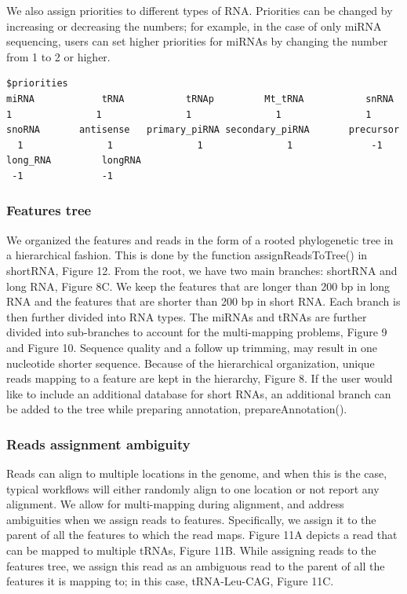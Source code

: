 \documentclass[12pt,twoside]{reedthesis}
\begin{document}
We also assign priorities to different types of RNA. Priorities can be
changed by increasing or decreasing the numbers; for example, in the
case of only miRNA sequencing, users can set higher priorities for
miRNAs by changing the number from 1 to 2 or higher.
\begin{verbatim}
$priorities
miRNA            tRNA           tRNAp         Mt_tRNA           snRNA         1               1               1               1               1
snoRNA       antisense   primary_piRNA secondary_piRNA       precursor
  1               1               1               1              -1
long_RNA         longRNA
 -1              -1
\end{verbatim}
\hypertarget{features-tree}{%
\subsubsection{Features tree}\label{features-tree}}

We organized the features and reads in the form of a rooted phylogenetic
tree in a hierarchical fashion. This is done by the function
assignReadsToTree() in shortRNA, Figure 12. From the root, we have two
main branches: shortRNA and long RNA, Figure 8C. We keep the features
that are longer than 200 bp in long RNA and the features that are
shorter than 200 bp in short RNA. Each branch is then further divided
into RNA types. The miRNAs and tRNAs are further divided into
sub-branches to account for the multi-mapping problems, Figure 9 and
Figure 10. Sequence quality and a follow up trimming, may result in one
nucleotide shorter sequence. Because of the hierarchical organization,
unique reads mapping to a feature are kept in the hierarchy, Figure 8.
If the user would like to include an additional database for short RNAs,
an additional branch can be added to the tree while preparing
annotation, prepareAnnotation().

\hypertarget{reads-assignment-ambiguity}{%
\subsubsection{Reads assignment ambiguity}\label{reads-assignment-ambiguity}}

Reads can align to multiple locations in the genome, and when this is
the case, typical workflows will either randomly align to one location
or not report any alignment. We allow for multi-mapping during
alignment, and address ambiguities when we assign reads to features.
Specifically, we assign it to the parent of all the features to which
the read maps. Figure 11A depicts a read that can be mapped to multiple
tRNAs, Figure 11B. While assigning reads to the features tree, we assign
this read as an ambiguous read to the parent of all the features it is
mapping to; in this case, tRNA-Leu-CAG, Figure 11C.
\end{document}
